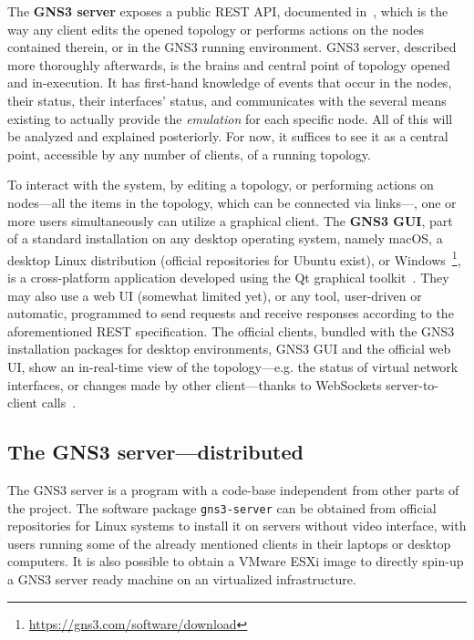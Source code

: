 The \textbf{GNS3 server} exposes a public \acrshort{REST} \acrshort{API}, documented in~\cite{gns3devarch}, which is the way any client edits the opened topology or performs actions on the nodes contained therein, or in the GNS3 running environment.
GNS3 server, described more thoroughly afterwards, is the brains and central point of topology opened and in-execution.
It has first-hand knowledge of events that occur in the nodes, their status, their interfaces' status, and communicates with the several means existing to actually provide the \emph{emulation} for each specific node.
All of this will be analyzed and explained posteriorly.
For now, it suffices to see it as a central point, accessible by any number of clients, of a running topology.

To interact with the system, by editing a topology, or performing actions on nodes---all the items in the topology, which can be connected via links---, one or more users simultaneously can utilize a graphical client. The \textbf{GNS3 GUI}, part of a standard installation on any desktop operating system, namely macOS, a desktop Linux distribution (official repositories for Ubuntu exist), or Windows~\footnote{\url{https://gns3.com/software/download}}, is a cross-platform application developed using the Qt graphical toolkit~\cite{qttoolkit}.
They may also use a web UI (somewhat limited yet), or any tool, user-driven or automatic, programmed to send requests and receive responses according to the aforementioned REST specification.
The official clients, bundled with the GNS3 installation packages for desktop environments, GNS3 GUI and the official web UI, show an in-real-time view of the topology---e.g. the status of virtual network interfaces, or changes made by other client---thanks to WebSockets server-to-client calls~\cite{ytgns3arch22}. %



\subsection{The GNS3 server---distributed}
\label{subsec:gns3serverindetail}

The GNS3 server is a program with a code-base independent from other parts of the project.
The software package \texttt{gns3-server} can be obtained from official repositories for Linux systems to install it on servers without video interface, with users running some of the already mentioned clients in their laptops or desktop computers.
It is also possible to obtain a VMware ESXi image to directly spin-up a GNS3 server ready machine on an virtualized infrastructure.

